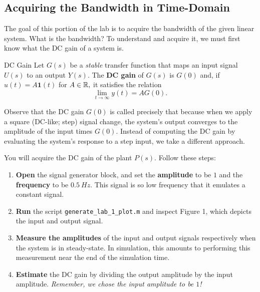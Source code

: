 \subsection{Acquiring the Bandwidth in Time-Domain}
The goal of this portion of the lab is to acquire the bandwidth of the
given linear system. What is the bandwidth? To understand and acquire it,
we must first know what the DC gain of a system is.
%
\begin{definition}[label={def:lab1:dcgain}]{DC Gain}
  Let \(G(s)\) be a \emph{stable} transfer function
  that maps an input signal \(U(s)\) to an
  output \(Y(s).\) The \textbf{DC gain} of \(G(s)\) is \(G(0)\) and,
  if \(u(t) = A \mathbf{1}(t)\) for \(A \in \mathbb{R},\) it satisfies the relation
  \[
    \lim_{t\to \infty} y(t) = A G(0).
  \]
\end{definition}
%
Observe that the DC gain \(G(0)\) is called precisely that because when we
apply a square (DC-like; step) signal change, the system's output converges
to the amplitude of the input times \(G(0).\)
%
Instead of computing the DC gain by evaluating the system's response to a step
input, we take a different approach.
%
\begin{procedure}[label={proc:lab1:p1}]
  You will acquire the DC gain of the plant \(P(s)\). Follow these steps:
  \begin{enumerate}[label=(\arabic*)]
    \item{
      \textbf{Open} the signal generator block, and set the
      \textbf{amplitude} to be \(1\) and the \textbf{frequency}
      to be \(\SI{0.5}{Hz}.\) This signal is so low frequency that it
      emulates a constant signal.
    }
    \item{
      \textbf{Run} the script \texttt{generate\_lab\_1\_plot.m} and inspect
      Figure 1, which depicts the input and output signal.
    }
    \item{
      \textbf{Measure the amplitudes} of the input and output signals
      respectively when the system is in steady-state. In simulation, this
      amounts to performing this measurement near the end of the simulation
      time.
    }
    \item{
      \textbf{Estimate} the DC gain by dividing the output amplitude
      by the input amplitude. \emph{Remember, we chose the input amplitude
      to be \(1\)!}
    }
  \end{enumerate}
\end{procedure}
%
